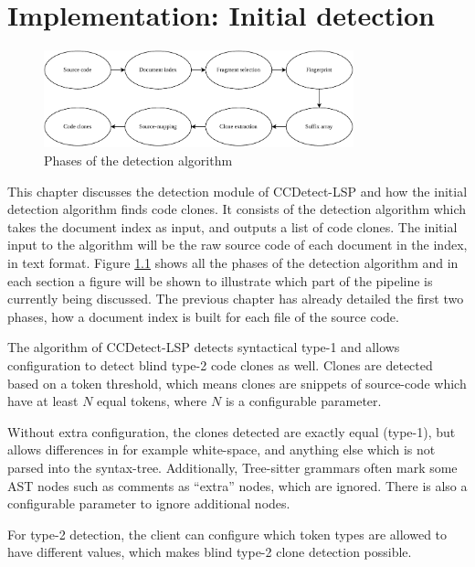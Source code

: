 \chapter{Implementation: Initial detection}
\label{initialdetection}

\begin{figure}[H]
    \begin{center}
        \includegraphics[width=0.8\textwidth]{figures/phases/phases_all.drawio.pdf}
    \end{center}
    \caption{Phases of the detection algorithm}
    \label{fig:allphases}
\end{figure}

This chapter discusses the detection module of CCDetect-LSP and how the initial detection
algorithm finds code clones. It consists of the detection algorithm which takes the
document index as input, and outputs a list of code clones. The initial input to the
algorithm will be the raw source code of each document in the index, in text format.
Figure \ref{fig:allphases} shows all the phases of the detection algorithm and in each
section a figure will be shown to illustrate which part of the pipeline is currently being
discussed. The previous chapter has already detailed the first two phases, how a document
index is built for each file of the source code.

The algorithm of CCDetect-LSP detects syntactical type-1 and allows configuration to
detect blind type-2 code clones as well. Clones are detected based on a token threshold,
which means clones are snippets of source-code which have at least $N$ equal tokens, where
$N$ is a configurable parameter. 

Without extra configuration, the clones detected are exactly equal (type-1), but allows
differences in for example white-space, and anything else which is not parsed into the
syntax-tree. Additionally, Tree-sitter grammars often mark some AST nodes such as comments
as ``extra'' nodes, which are ignored. There is also a configurable parameter to ignore
additional nodes. 

For type-2 detection, the client can configure which token types are allowed to have
different values, which makes blind type-2 clone detection possible.  

